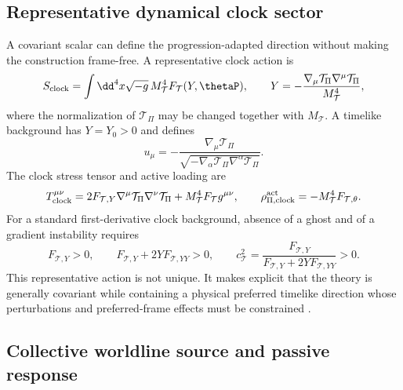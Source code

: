 \documentclass[12pt]{article}
\begin{document}
\subsection{Representative dynamical clock sector}

A covariant scalar can define the progression-adapted direction without making the construction frame-free.  A representative clock action is
\begin{equation}
    S_{\rm clock}
    =\int\dd^4x\sqrt{-g}\,M_{\mathcal T}^4
      F_{\mathcal T}(Y,\thetaP),
    \qquad
    Y=-\frac{\nabla_\mu\mathcal T_\Pi\nabla^\mu\mathcal T_\Pi}
            {M_{\mathcal T}^4},
    \label{eq:representative-clock-action}
\end{equation}
where the normalization of \(\mathcal T_\Pi\) may be changed together with \(M_{\mathcal T}\).  A timelike background has \(Y=Y_0>0\) and defines
\begin{equation}
    u_\mu=-\frac{\nabla_\mu\mathcal T_\Pi}
    {\sqrt{-\nabla_\alpha\mathcal T_\Pi\nabla^\alpha\mathcal T_\Pi}}.
\end{equation}
The clock stress tensor and active loading are
\begin{equation}
    T_{\rm clock}^{\mu\nu}
    =2F_{\mathcal T,Y}\nabla^\mu\mathcal T_\Pi
      \nabla^\nu\mathcal T_\Pi
      +M_{\mathcal T}^4F_{\mathcal T}g^{\mu\nu},
    \qquad
    \rho_{\Pi,{\rm clock}}^{\rm act}
    =-M_{\mathcal T}^4F_{\mathcal T,\theta}.
    \label{eq:clock-stress-source}
\end{equation}
For a standard first-derivative clock background, absence of a ghost and of a gradient instability requires
\begin{equation}
    F_{\mathcal T,Y}>0,
    \qquad
    F_{\mathcal T,Y}+2YF_{\mathcal T,YY}>0,
    \qquad
    c_{\mathcal T}^2=
    \frac{F_{\mathcal T,Y}}
    {F_{\mathcal T,Y}+2YF_{\mathcal T,YY}}>0.
    \label{eq:clock-stability}
\end{equation}
This representative action is not unique.  It makes explicit that the theory is generally covariant while containing a physical preferred timelike direction whose perturbations and preferred-frame effects must be constrained \cite{JacobsonMattingly2001,ArmendarizPicon2001}.

\subsection{Collective worldline source and passive response}
\end{document}
